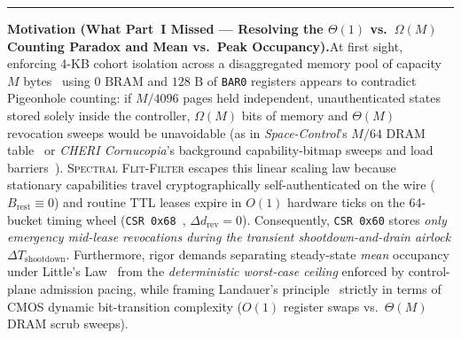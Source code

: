 \documentclass[10pt,twocolumn]{article}
\makeatletter
\newif\ifspecintwocol \specintwocolfalse
\newif\ifspecresume   \specresumefalse
\newcommand{\StopTwoCol}{%
  \if@twocolumn
    \onecolumn
    \global\specintwocolfalse
    \let\spec@next\@empty
  \else
    \ifspecintwocol
      \global\specintwocolfalse
      \def\spec@next{\end{multicols}}%
    \else
      \let\spec@next\@empty
    \fi
  \fi
  \spec@next
}
\newcommand{\BeginConnesPlate}{%
  \if@twocolumn
    \onecolumn
    \global\specresumetrue
    \let\spec@platepre\@empty
  \else
    \ifspecintwocol
      \global\specresumetrue
      \let\spec@platepre\StopTwoCol
    \else
      \global\specresumefalse
      \let\spec@platepre\@empty
    \fi
  \fi
  \spec@platepre
  \par\vspace{4pt}\noindent\textcolor{black!25}{\rule{\textwidth}{0.4pt}}\par\vspace{3pt}%
}
\theoremstyle{spectralthm}
\makeatother
\begin{document}
\StopTwoCol
\BeginConnesPlate
\noindent\textbf{Motivation (What Part~I Missed --- Resolving the $\Theta(1)$ vs.\ $\Omega(M)$ Counting Paradox and Mean vs.\ Peak Occupancy).}\;At first sight, enforcing 4-KB cohort isolation across a disaggregated memory pool of capacity $M$ bytes~\cite{li2023pond,sun2023demystifying} using $0\text{~BRAM}$ and $128\text{~B}$ of \texttt{BAR0} registers appears to contradict Pigeonhole counting: if $M/4096$ pages held independent, unauthenticated states stored solely inside the controller, $\Omega(M)$ bits of memory and $\Theta(M)$ revocation sweeps would be unavoidable (as in \textit{Space-Control}'s $M/64$ DRAM table~\cite{goswami2026spacecontrol} or \textit{CHERI Cornucopia}'s background capability-bitmap sweeps and load barriers~\cite{woodruff2014cheri,watson2015cheri,filardo2020cornucopia,filardo2024cornucopiareloaded}). \textsc{Spectral Flit-Filter} escapes this linear scaling law because stationary capabilities travel cryptographically self-authenticated on the wire ($B_{\mathrm{rest}} \equiv 0$) and routine TTL leases expire in $O(1)$ hardware ticks on the 64-bucket timing wheel (\texttt{CSR 0x68}~\cite{varghese1997timing}, $\Delta d_{\mathrm{rev}} = 0$). Consequently, \texttt{CSR 0x60} stores \emph{only emergency mid-lease revocations during the transient shootdown-and-drain airlock} $\Delta T_{\mathrm{shootdown}}$. Furthermore, rigor demands separating steady-state \emph{mean} occupancy under Little's Law~\cite{little1961proof} from the \emph{deterministic worst-case ceiling} enforced by control-plane admission pacing, while framing Landauer's principle~\cite{landauer1961irreversibility} strictly in terms of CMOS dynamic bit-transition complexity ($O(1)$ register swaps vs.\ $\Theta(M)$ DRAM scrub sweeps).
\end{document}
